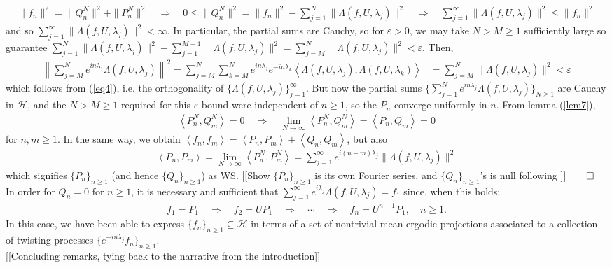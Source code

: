 \documentclass[11pt]{report}
\newcommand{\mc}[1]{\mathcal{#1}}
\newcommand{\ip}[2]{\left\langle#1,#2\right\rangle }
\newcommand{\1}[1]{\mathbbm{1}_{\{#1\}}}
\theoremstyle{definition}
\begin{document}
    \begin{align}
        \|f_n\|^2=\|Q^N_n\|^2+\|P^N_n\|^2\quad\Rightarrow\quad 0\leq \|Q^N_n\|^2=\|f_n\|^2-\sum_{j=1}^N\|\Lambda(f,U,\lambda_j)\|^2\quad\Rightarrow\quad \sum_{j=1}^\infty\|\Lambda(f,U,\lambda_j)\|^2\leq \|f_n\|^2\label{eq5}
    \end{align}
    and so $\sum_{j=1}^\infty\|\Lambda(f,U,\lambda_j)\|^2<\infty$. In particular, the partial sums are Cauchy, so for $\varepsilon>0$, we may take $N>M\geq 1$ sufficiently large so guarantee $\sum_{j=1}^N\|\Lambda(f,U,\lambda_j)\|^2-\sum_{j=1}^{M-1}\|\Lambda(f,U,\lambda_j)\|^2=\sum_{j=M}^N\|\Lambda(f,U,\lambda_j)\|^2<\varepsilon$. Then,
    \begin{align*}
        \left\|\sum_{j=M}^Ne^{in\lambda_j}\Lambda(f,U,\lambda_j)\right\|^2=\sum_{j=M}^N\sum_{k=M}^Ne^{in\lambda_j}e^{-in\lambda_k}\ip{\Lambda(f,U,\lambda_j)}{\Lambda(f,U,\lambda_k)}&=\sum_{j=M}^N\|\Lambda(f,U,\lambda_j)\|^2<\varepsilon
    \end{align*}
    which follows from (\ref{eq4}), i.e. the orthogonality of $\{\Lambda(f,U,\lambda_j)\}_{j=1}^\infty$. But now the partial sums $\{\sum_{j=1}^Ne^{in\lambda_j}\Lambda(f,U,\lambda_j)\}_{N\geq 1}$ are Cauchy in $\mc{H}$, and the $N>M\geq 1$ required
    for this $\varepsilon$-bound were independent of $n\geq 1$, so the $P_n$ converge uniformly in $n$. From lemma (\ref{lem7}),
    \begin{align*}
        \ip{P^N_n}{Q^N_m}=0\quad\Rightarrow\quad\lim_{N\rightarrow\infty}\ip{P^N_n}{Q^N_m}=\ip{P_n}{Q_m}=0
    \end{align*} 
    for $n,m\geq 1$. In the same way, we obtain $\ip{f_n}{f_m}=\ip{P_n}{P_m}+\ip{Q_n}{Q_m}$, but also
    \begin{align*}
        \ip{P_n}{P_m}=\lim_{N\rightarrow\infty}\ip{P^N_n}{P^N_m}=\sum_{j=1}^\infty e^{i(n-m)\lambda_j}\|\Lambda(f,U,\lambda_j)\|^2
    \end{align*}
    which signifies $\{P_n\}_{n\geq 1}$ (and hence $\{Q_n\}_{n\geq 1}$) as WS. [[Show $\{P_n\}_{n\geq 1}$ is its own Fourier series, and $\{Q_n\}_{n\geq 1}$'s is null following \cite[theorem 10]{Fan_1946}]]\hfill{$\qed$}\\[5pt]
    \indent In order for $Q_n=0$ for $n\geq 1$, it is necessary and sufficient that $\sum_{j=1}^\infty e^{i\lambda_j}\Lambda(f,U,\lambda_j)=f_1$ since, when this holds:
    \begin{align*}
        f_1=P_1\quad\Rightarrow\quad f_2=UP_1\quad\Rightarrow\quad\cdots\quad\Rightarrow\quad f_n=U^{n-1}P_1,\quad n\geq 1.
    \end{align*}
    In this case, we have been able to express $\{f_n\}_{n\geq 1}\subseteq\mc{H}$ in terms of a set of nontrivial mean ergodic projections associated to a collection of twisting processes $\{e^{-in\lambda_j}f_n\}_{n\geq 1}$.\\[5pt] 
    [[Concluding remarks, tying back to the narrative from the introduction]]
    \newpage
    
    
\end{document}
